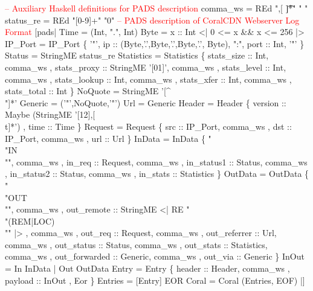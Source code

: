 
\begin{code}
\textcolor{red}{-- Auxiliary Haskell definitions for PADS description}
comma\_ws  = REd ",[ \t]*" " "
status\_re = REd "[0-9]+" "0"
\mbox{}
\textcolor{red}{-- PADS description of CoralCDN Webserver Log Format}
[pads|
   Time = (Int, ".", Int)
\mbox{}
   Byte =  x :: Int  <| 0 <= x && x <= 256 |>
\mbox{}
   IP\_Port = IP\_Port
    \{ '"', 
      ip :: (Byte,'.',Byte,'.',Byte,'.', Byte), ":",
      port :: Int, '"' \}
\mbox{}
   Status = StringME status\_re
\mbox{}
   Statistics = Statistics
    \{ stats\_size       :: Int,              comma\_ws
    , stats\_proxy      :: StringME '[01]',  comma\_ws
    , stats\_level      :: Int,              comma\_ws
    , stats\_lookup     :: Int,              comma\_ws
    , stats\_xfer       :: Int,              comma\_ws
    , stats\_total      :: Int \}
\mbox{}
   NoQuote = StringME '[^\\"]*'
\mbox{}
   Generic = ('"',NoQuote,'"')
\mbox{}
   Url = Generic
\mbox{}
   Header = Header
    \{ version       :: Maybe (StringME '[12],[ \\t]*')
    , time          :: Time     \}
\mbox{}
   Request = Request
   \{ src       :: IP\_Port, comma\_ws
   , dst       :: IP\_Port, comma\_ws
   , url       :: Url \} 
\mbox{}
   InData = InData
    \{ "\\"IN\\"",               comma\_ws
    , in\_req     :: Request,  comma\_ws
    , in\_status1 :: Status,   comma\_ws
    , in\_status2 :: Status,   comma\_ws
    , in\_stats   :: Statistics \}
\mbox{}
   OutData = OutData
    \{ "\\"OUT\\"",                            comma\_ws 
    , out\_remote    :: StringME <| RE "\\"(REM|LOC)\\"" |> , comma\_ws
    , out\_req       :: Request,             comma\_ws
    , out\_referrer  :: Url,                 comma\_ws
    , out\_status    :: Status,              comma\_ws
    , out\_stats     :: Statistics,          comma\_ws
    , out\_forwarded :: Generic,             comma\_ws
    , out\_via       :: Generic  \}
\mbox{}
   InOut = In InData | Out OutData
\mbox{}
   Entry = Entry
    \{ header  :: Header,   comma\_ws
    , payload :: InOut
    , Eor \}
\mbox{}
   Entries = [Entry]  EOR
\mbox{}  
   Coral = Coral (Entries, EOF)
|]
\end{code}

